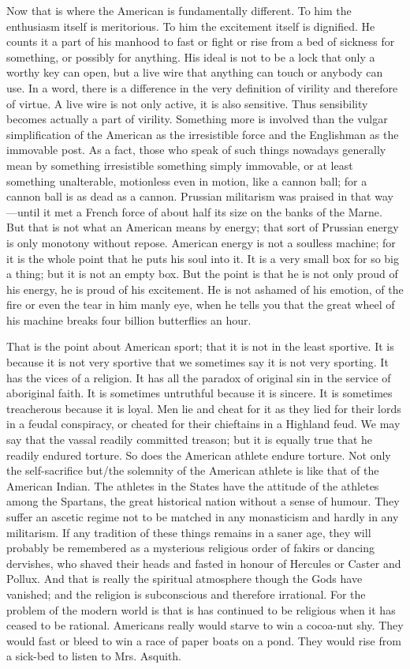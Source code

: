\documentclass{book}
\begin{document}
Now that is where the American is fundamentally different. To him the enthusiasm itself is meritorious. To him the excitement itself is dignified. He counts it a part of his manhood to fast or fight or rise from a bed of sickness for something, or possibly for anything. His ideal is not to be a lock that only a worthy key can open, but a live wire that anything can touch or anybody can use. In a word, there is a difference in the very definition of virility and therefore of virtue. A live wire is not only active, it is also sensitive. Thus sensibility becomes actually a part of virility. Something more is involved than the vulgar simplification of the American as the irresistible force and the Englishman as the immovable post. As a fact, those who speak of such things nowadays generally mean by something irresistible something simply immovable, or at least something unalterable, motionless even in motion, like a cannon ball; for a cannon ball is as dead as a cannon. Prussian militarism was praised in that way—until it met a French force of about half its size on the banks of the Marne. But that is not what an American means by energy; that sort of Prussian energy is only monotony without repose. American energy is not a soulless machine; for it is the whole point that he puts his soul into it. It is a very small box for so big a thing; but it is not an empty box. But the point is that he is not only proud of his energy, he is proud of his excitement. He is not ashamed of his emotion, of the fire or even the tear in him manly eye, when he tells you that the great wheel of his machine breaks four billion butterflies an hour.

That is the point about American sport; that it is not in the least sportive. It is because it is not very sportive that we sometimes say it is not very sporting. It has the vices of a religion. It has all the paradox of original sin in the service of aboriginal faith. It is sometimes untruthful because it is sincere. It is sometimes treacherous because it is loyal. Men lie and cheat for it as they lied for their lords in a feudal conspiracy, or cheated for their chieftains in a Highland feud. We may say that the vassal readily committed treason; but it is equally true that he readily endured torture. So does the American athlete endure torture. Not only the self-sacrifice but/the solemnity of the American athlete is like that of the American Indian. The athletes in the States have the attitude of the athletes among the Spartans, the great historical nation without a sense of humour. They suffer an ascetic regime not to be matched in any monasticism and hardly in any militarism. If any tradition of these things remains in a saner age, they will probably be remembered as a mysterious religious order of fakirs or dancing dervishes, who shaved their heads and fasted in honour of Hercules or Caster and Pollux. And that is really the spiritual atmosphere though the Gods have vanished; and the religion is subconscious and therefore irrational. For the problem of the modern world is that is has continued to be religious when it has ceased to be rational. Americans really would starve to win a cocoa-nut shy. They would fast or bleed to win a race of paper boats on a pond. They would rise from a sick-bed to listen to Mrs. Asquith.
\end{document}
